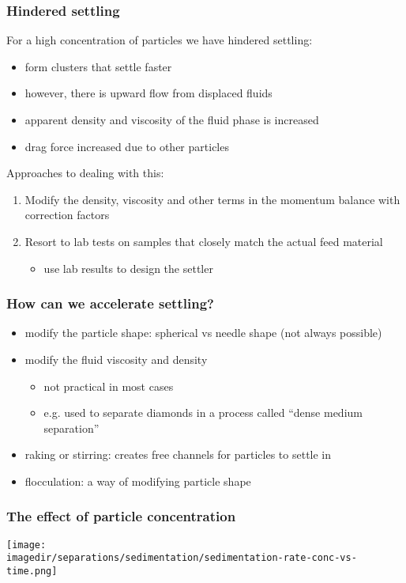 \begin{frame}\frametitle{Hindered settling}
	For a high concentration of particles we have hindered settling:
	\begin{itemize}
		\item	form clusters that settle faster
		\item	however, there is upward flow from displaced fluids
		\item	apparent density and viscosity of the fluid phase is increased
		\item	drag force increased due to other particles
	\end{itemize}
	
	Approaches to dealing with this:
	\begin{enumerate}
		\item	Modify the density, viscosity and other terms in the momentum balance with correction factors
		\item	Resort to lab tests on samples that closely match the actual feed material
		\begin{itemize}
			\item	use lab results to design the settler
		\end{itemize}
	\end{enumerate}
\end{frame}

\begin{frame}\frametitle{How can we accelerate settling?}
	\begin{itemize}
		\item	modify the particle shape: spherical vs needle shape (not always possible)
		\item	modify the fluid viscosity and density 
		\begin{itemize}
			\item	not practical in most cases
			\item	e.g. used to separate diamonds in a process called ``dense medium separation''
		\end{itemize}
		\item	raking or stirring: creates free channels for particles to settle in
		\item	flocculation: a way of modifying particle shape
	\end{itemize}
\end{frame}

\begin{frame}\frametitle{The effect of particle concentration}
	\begin{center}
		\texttt{[image: \\imagedir/separations/sedimentation/sedimentation-rate-conc-vs-time.png]}
	\end{center}
\end{frame}


